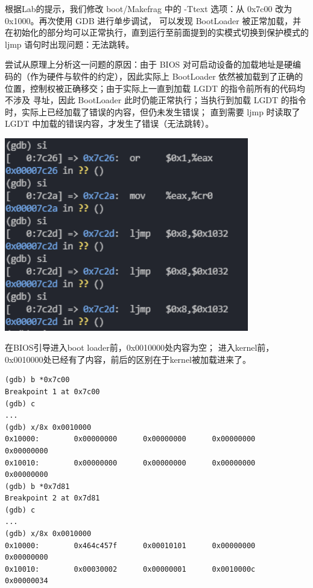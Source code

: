 \documentclass[12pt, letterpaper]{report}
\begin{document}
根据Lab的提示，我们修改 boot/Makefrag 中的 -Ttext 选项：从 0x7c00 改为 0x1000。再次使用 GDB 进行单步调试，
可以发现 BootLoader 被正常加载，并在初始化的部分均可以正常执行，直到运行至前面提到的实模式切换到保护模式的
 ljmp 语句时出现问题：无法跳转。 \par
尝试从原理上分析这一问题的原因：由于 BIOS 对可启动设备的加载地址是硬编码的（作为硬件与软件的约定），因此实际上
 BootLoader 依然被加载到了正确的位置，控制权被正确移交；由于实际上一直到加载 LGDT 的指令前所有的代码均不涉及
寻址，因此 BootLoader 此时仍能正常执行；当执行到加载 LGDT 的指令时，实际上已经加载了错误的内容，但仍未发生错误；
直到需要 ljmp 时读取了 LGDT 中加载的错误内容，才发生了错误（无法跳转）。\par 
\quad \par 
\includegraphics[width=0.8\textwidth]{cantJmp}
\quad \par 


在BIOS引导进入boot loader前，0x0010000处内容为空；
进入kernel前，0x0010000处已经有了内容，前后的区别在于kernel被加载进来了。

\lstset{style=AssemblyStyle}
\setmainfont{Consolas}
\begin{lstlisting}
(gdb) b *0x7c00
Breakpoint 1 at 0x7c00
(gdb) c
...  
(gdb) x/8x 0x0010000
0x10000:        0x00000000      0x00000000      0x00000000      0x00000000
0x10010:        0x00000000      0x00000000      0x00000000      0x00000000
(gdb) b *0x7d81
Breakpoint 2 at 0x7d81
(gdb) c
...
(gdb) x/8x 0x0010000
0x10000:        0x464c457f      0x00010101      0x00000000      0x00000000
0x10010:        0x00030002      0x00000001      0x0010000c      0x00000034
\end{lstlisting}
\setmainfont{Times New Roman}
\end{document}
